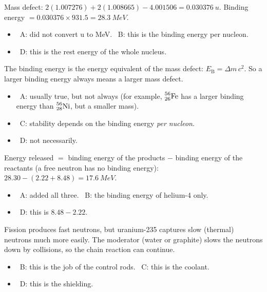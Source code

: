 \documentclass[12pt]{article}
\newcommand\nuc[3]{\ensuremath{\prescript{#1}{#2}{\mathrm{#3}}}}
\begin{document}
\begin{practiceanswers}
\begin{practiceans}
  Mass defect: $2(1.007276) + 2(1.008665) - 4.001506 = \qty{0.030376}{u}$. \quad
  Binding energy $= 0.030376 \times 931.5 = \qty{28.3}{MeV}$.
  \begin{itemize}
    \item \xmark\ A: did not convert u to MeV. \quad \xmark\ B: this is the binding energy per nucleon.
    \item \xmark\ D: this is the rest energy of the whole nucleus.
  \end{itemize}
\end{practiceans}

\begin{practiceans}
  The binding energy is the energy equivalent of the mass defect: $E_\mathrm{B} = \Delta m\,c^2$. So a
  larger binding energy always means a larger mass defect.
  \begin{itemize}
    \item \xmark\ A: usually true, but not always (for example, \nuc{56}{26}{Fe} has a larger binding energy
          than \nuc{56}{28}{Ni}, but a smaller mass).
    \item \xmark\ C: stability depends on the binding energy \emph{per nucleon}.
    \item \xmark\ D: not necessarily.
  \end{itemize}
\end{practiceans}

\begin{practiceans}
  Energy released $=$ binding energy of the products $-$ binding energy of the reactants (a free neutron
  has no binding energy): $28.30 - (2.22 + 8.48) = \qty{17.6}{MeV}$.
  \begin{itemize}
    \item \xmark\ A: added all three. \quad \xmark\ B: the binding energy of helium-4 only.
    \item \xmark\ D: this is $8.48 - 2.22$.
  \end{itemize}
\end{practiceans}

\begin{practiceans}
  Fission produces fast neutrons, but uranium-235 captures slow (thermal) neutrons much more easily. The
  moderator (water or graphite) slows the neutrons down by collisions, so the chain reaction can continue.
  \begin{itemize}
    \item \xmark\ B: this is the job of the control rods. \quad \xmark\ C: this is the coolant.
    \item \xmark\ D: this is the shielding.
  \end{itemize}
\end{practiceans}


\end{practiceanswers}
\end{document}
